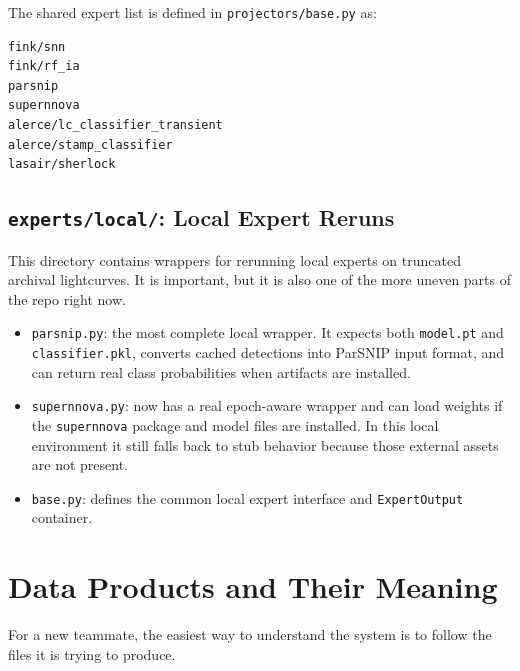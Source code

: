 \documentclass[11pt]{article}
\newcommand{\code}[1]{\texttt{#1}}
\begin{document}
The shared expert list is defined in \code{projectors/base.py} as:

\begin{verbatim}
fink/snn
fink/rf_ia
parsnip
supernnova
alerce/lc_classifier_transient
alerce/stamp_classifier
lasair/sherlock
\end{verbatim}

\subsection{\code{experts/local/}: Local Expert Reruns}

This directory contains wrappers for rerunning local experts on truncated archival lightcurves. It is important, but it is also one of the more uneven parts of the repo right now.

\begin{itemize}
\item \code{parsnip.py}: the most complete local wrapper. It expects both \code{model.pt} and \code{classifier.pkl}, converts cached detections into ParSNIP input format, and can return real class probabilities when artifacts are installed.
\item \code{supernnova.py}: now has a real epoch-aware wrapper and can load weights if the \code{supernnova} package and model files are installed. In this local environment it still falls back to stub behavior because those external assets are not present.
\item \code{base.py}: defines the common local expert interface and \code{ExpertOutput} container.
\end{itemize}

\section{Data Products and Their Meaning}

For a new teammate, the easiest way to understand the system is to follow the files it is trying to produce.
\end{document}
